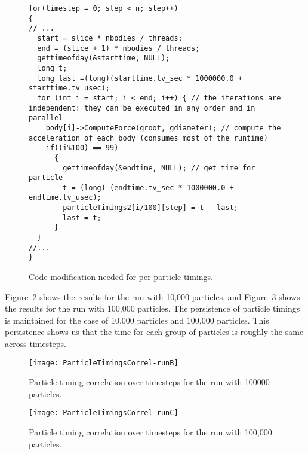 \documentclass[11pt]{article}
\begin{document}

\begin{figure}[ht!]
\label{code:particleTimings}
\begin{lstlisting}
for(timestep = 0; step < n; step++)
{
// ...
  start = slice * nbodies / threads;
  end = (slice + 1) * nbodies / threads;
  gettimeofday(&starttime, NULL);
  long t;
  long last =(long)(starttime.tv_sec * 1000000.0 + starttime.tv_usec);
  for (int i = start; i < end; i++) { // the iterations are independent: they can be executed in any order and in parallel
    body[i]->ComputeForce(groot, gdiameter); // compute the acceleration of each body (consumes most of the runtime)             
    if((i%100) == 99)
      {
        gettimeofday(&endtime, NULL); // get time for particle
        t = (long) (endtime.tv_sec * 1000000.0 + endtime.tv_usec);
        particleTimings2[i/100][step] = t - last;
        last = t;
      }
  }
//...
}
\end{lstlisting}
\caption{\label{code:particleTimings} Code modification needed for per-particle timings.}
\end{figure}

Figure~\ref{fig:particleTimingsCorrel-runB} shows the results for the
run with 10,000 particles, and
Figure~\ref{fig:particleTimingsCorrel-runC} shows the results for the run with 100,000 particles. The persistence of particle timings is 
maintained for the case of 10,000 particles and 100,000
particles. This persistence shows us that the time for each group of
particles is roughly the same across timesteps. 

\begin{figure}[ht!]
\label{fig:particleTimingsCorrel-runB}
\begin{center}
\texttt{[image: ParticleTimingsCorrel-runB]}
\end{center}
\caption{\label{fig:particleTimingsCorrel-runB}Particle timing
  correlation over timesteps for the run with 100000 particles.}
\end{figure} 

\begin{figure}[ht!]
\label{fig:particleTimingsCorrel-runC}
\begin{center}
\texttt{[image: ParticleTimingsCorrel-runC]}
\end{center}
\caption{\label{fig:particleTimingsCorrel-runC}Particle timing
 correlation over timesteps for the run with 100,000 particles.}
\end{figure}
\end{document}
